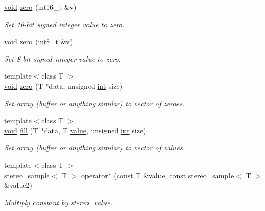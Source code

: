 \begin{DoxyCompactItemize}
\hyperlink{tk_8h_aba408b7cd755a96426e004c015f5de8e}{void} \hyperlink{namespacedsp_a50b7baf4a4f14897839d37d5f58de63b}{zero} (int16\+\_\+t \&v)
\begin{DoxyCompactList}\small\item\em Set 16-\/bit signed integer value to zero. \end{DoxyCompactList}\item 
\hyperlink{tk_8h_aba408b7cd755a96426e004c015f5de8e}{void} \hyperlink{namespacedsp_af140a0801d6191807b799173dd6440f8}{zero} (int8\+\_\+t \&v)
\begin{DoxyCompactList}\small\item\em Set 8-\/bit signed integer value to zero. \end{DoxyCompactList}\item 
{\footnotesize template$<$class T $>$ }\\\hyperlink{tk_8h_aba408b7cd755a96426e004c015f5de8e}{void} \hyperlink{namespacedsp_a1aaff1d9c2e57d505ac50b4f616f8b3a}{zero} (T $\ast$data, unsigned \hyperlink{tk_8h_a83f82f76e7fed06f4c49d2db94028a6d}{int} size)
\begin{DoxyCompactList}\small\item\em Set array (buffer or anything similar) to vector of zeroes. \end{DoxyCompactList}\item 
{\footnotesize template$<$class T $>$ }\\\hyperlink{tk_8h_aba408b7cd755a96426e004c015f5de8e}{void} \hyperlink{namespacedsp_ab366ae27401d13f995b91c5bb224e5a8}{fill} (T $\ast$data, T \hyperlink{tk_8h_a177a0765f574ef6642002696d9cd82d0}{value}, unsigned \hyperlink{tk_8h_a83f82f76e7fed06f4c49d2db94028a6d}{int} size)
\begin{DoxyCompactList}\small\item\em Set array (buffer or anything similar) to vector of values. \end{DoxyCompactList}\item 
{\footnotesize template$<$class T $>$ }\\\hyperlink{structdsp_1_1stereo__sample}{stereo\+\_\+sample}$<$ T $>$ \hyperlink{namespacedsp_a6083af7d30b3df78aa1901cd2c59e414}{operator$\ast$} (const T \&\hyperlink{tk_8h_a177a0765f574ef6642002696d9cd82d0}{value}, const \hyperlink{structdsp_1_1stereo__sample}{stereo\+\_\+sample}$<$ T $>$ \&value2)
\begin{DoxyCompactList}\small\item\em Multiply constant by stereo\+\_\+value. \end{DoxyCompactList}\item 

\end{DoxyCompactItemize}
